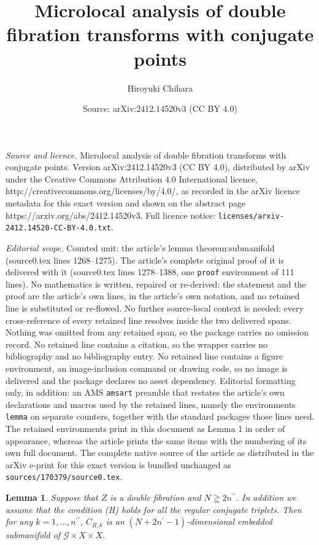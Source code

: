 \documentclass[10pt,a4paper]{amsart}
\title{Microlocal analysis of double fibration transforms with conjugate points}
\author{Hiroyuki Chihara}
\date{Source: arXiv:2412.14520v3 (CC BY 4.0)}
\newtheorem{lemma}{Lemma}
\begin{document}
\maketitle

\noindent\emph{Source and licence.} Microlocal analysis of double fibration transforms with conjugate points. Version arXiv:2412.14520v3 (CC BY 4.0), distributed by arXiv under the Creative Commons Attribution 4.0 International licence, http://creativecommons.org/licenses/by/4.0/, as recorded in the arXiv licence metadata for this exact version and shown on the abstract page https://arxiv.org/abs/2412.14520v3. Full licence notice: \texttt{licenses/arxiv-2412.14520-CC-BY-4.0.txt}.\par\smallskip

\noindent\textit{Editorial scope.} Counted unit: the article's lemma theorem:submanifold (source0.tex lines 1268--1275). The article's complete original proof of it is delivered with it (source0.tex lines 1278--1388, one \texttt{proof} environment of 111 lines). No mathematics is written, repaired or re-derived: the statement and the proof are the article's own lines, in the article's own notation, and no retained line is substituted or re-flowed.  No further source-local context is needed: every cross-reference of every retained line resolves inside the two delivered spans.  Nothing was omitted from any retained span, so the package carries no omission record.  No retained line contains a citation, so the wrapper carries no bibliography and no bibliography entry.  No retained line contains a figure environment, an image-inclusion command or drawing code, so no image is delivered and the package declares no asset dependency.  Editorial formatting only, in addition: an AMS \texttt{amsart} preamble that restates the article's own declarations and macros used by the retained lines, namely the environments \texttt{lemma} on separate counters, together with the standard packages those lines need.  The retained environments print in this document as Lemma 1 in order of appearance, whereas the article prints the same items with the numbering of its own full document.  The complete native source of the article as distributed in the arXiv e-print for this exact version is bundled unchanged as \texttt{sources/170379/source0.tex}.
\begin{lemma}
\label{theorem:submanifold} 
Suppose that $Z$ is a double fibration and $N \geqq 2n^{\prime\prime}$. 
In addition we assume that the condition {\rm (H)} holds 
for all the regular conjugate triplets. 
Then for any $k=1,\dotsc,n^{\prime\prime}$, 
$C_{R,k}$ is an $(N+2n^\prime-1)$-dimensional embedded submanifold of $\mathcal{G}{\times}X{\times}X$. 
\end{lemma}
\end{document}
